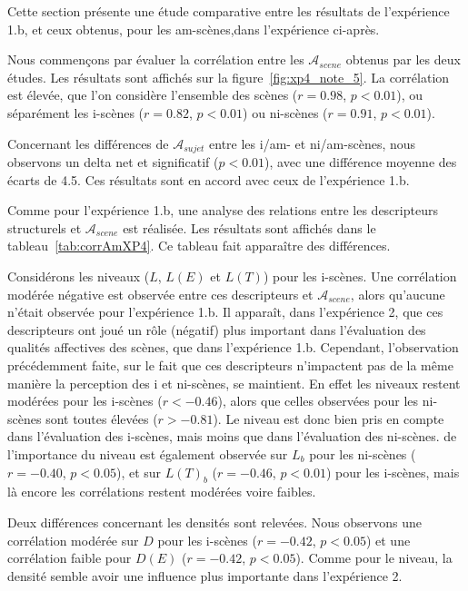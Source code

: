 Cette section présente une étude comparative entre les résultats de l'expérience 1.b, et ceux obtenus, pour les am-scènes,dans l'expérience ci-après. 

Nous commençons par évaluer la corrélation entre les $\mathcal{A}_{scene}$ obtenus par les deux études. Les résultats sont affichés sur la figure~\ref{fig:xp4_note_5}. La corrélation est élevée, que l'on considère l'ensemble des scènes ($r=0.98$, $p<0.01$), ou séparément les i-scènes ($r=0.82$, $p<0.01$) ou ni-scènes ($r=0.91$, $p<0.01$).

Concernant les différences de $\mathcal{A}_{sujet}$ entre les i/am- et ni/am-scènes, nous observons un delta net et significatif ($p<0.01$), avec une différence moyenne des écarts de 4.5. Ces résultats sont en accord avec ceux de l'expérience 1.b.

Comme pour l'expérience 1.b, une analyse des relations entre les descripteurs structurels et $\mathcal{A}_{scene}$ est réalisée. Les résultats sont affichés dans le tableau~\ref{tab:corrAmXP4}. Ce tableau fait apparaître des différences. 

Considérons les niveaux ($L$, $L(E)$ et $L(T)$) pour les i-scènes. Une corrélation modérée négative est observée entre ces descripteurs et $\mathcal{A}_{scene}$, alors qu'aucune n'était observée pour l'expérience 1.b. Il apparaît, dans l'expérience 2, que ces descripteurs ont joué un rôle (négatif) plus important dans l'évaluation des qualités affectives des scènes, que dans l'expérience 1.b. Cependant, l'observation précédemment faite, sur le fait que ces descripteurs n'impactent pas de la même manière la perception des i et ni-scènes, se maintient. En effet   les niveaux restent modérées pour les i-scènes ($r<-0.46$), alors que celles observées pour les ni-scènes sont toutes élevées ($r>-0.81$). Le niveau est donc bien pris en compte dans l'évaluation des i-scènes, mais moins que dans l'évaluation des ni-scènes.   de l'importance du niveau est également observée sur $L_b$ pour les ni-scènes ($r=-0.40$, $p<0.05$), et sur $L(T)_b$ ($r=-0.46$, $p<0.01$) pour les i-scènes, mais là encore les corrélations restent modérées voire faibles.

Deux différences concernant les densités sont relevées. Nous observons une corrélation modérée sur $D$ pour les i-scènes ($r=-0.42$, $p<0.05$) et une corrélation faible pour $D(E)$ ($r=-0.42$, $p<0.05$). Comme pour le niveau, la densité semble avoir une influence plus importante dans l'expérience 2. 

